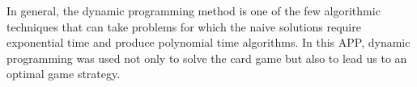 \documentclass[a4paper,12pt,fleqn]{article}
\newcommand\ezskip{\medskip\noindent}
\begin{document}
\ezskip In general, the dynamic programming method is one of the few algorithmic techniques that can take problems for which the naive solutions require exponential time and produce polynomial time algorithms. In this APP, dynamic programming was used not only to solve the card game but also to lead us to an optimal game strategy.
\end{document}
